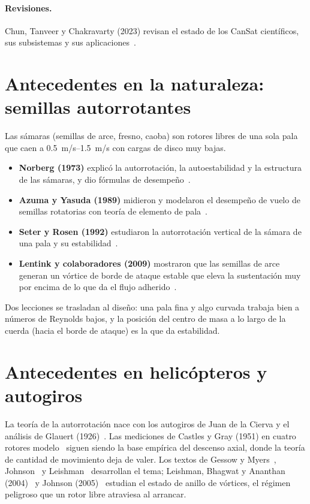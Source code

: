 \paragraph{Revisiones.} Chun, Tanveer y Chakravarty (2023) revisan el estado de los
CanSat científicos, sus subsistemas y sus aplicaciones~\cite{chun2023}.

\section{Antecedentes en la naturaleza: semillas autorrotantes}
Las sámaras (semillas de arce, fresno, caoba) son rotores libres de una sola pala que
caen a \SIrange{0.5}{1.5}{m/s} con cargas de disco muy bajas.
\begin{itemize}
  \item \textbf{Norberg (1973)} explicó la autorrotación, la autoestabilidad y la
        estructura de las sámaras, y dio fórmulas de desempeño~\cite{norberg1973}.
  \item \textbf{Azuma y Yasuda (1989)} midieron y modelaron el desempeño de vuelo de
        semillas rotatorias con teoría de elemento de pala~\cite{azuma1989}.
  \item \textbf{Seter y Rosen (1992)} estudiaron la autorrotación vertical de la sámara
        de una pala y su estabilidad~\cite{seter1992}.
  \item \textbf{Lentink y colaboradores (2009)} mostraron que las semillas de arce
        generan un vórtice de borde de ataque estable que eleva la sustentación muy por
        encima de lo que da el flujo adherido~\cite{lentink2009}.
\end{itemize}
Dos lecciones se trasladan al diseño: una pala fina y algo curvada trabaja bien a
números de Reynolds bajos, y la posición del centro de masa a lo largo de la cuerda
(hacia el borde de ataque) es la que da estabilidad.

\section{Antecedentes en helicópteros y autogiros}
La teoría de la autorrotación nace con los autogiros de Juan de la Cierva y el análisis
de Glauert (1926)~\cite{glauert1926}. Las mediciones de Castles y Gray (1951) en cuatro
rotores modelo~\cite{castles1951} siguen siendo la base empírica del descenso axial,
donde la teoría de cantidad de movimiento deja de valer. Los textos de
Gessow y Myers~\cite{gessow1952}, Johnson~\cite{johnson1980,johnson2013} y
Leishman~\cite{leishman2006} desarrollan el tema; Leishman, Bhagwat y Ananthan
(2004)~\cite{leishman2004} y Johnson (2005)~\cite{johnson2005} estudian el estado de
anillo de vórtices, el régimen peligroso que un rotor libre atraviesa al arrancar.

